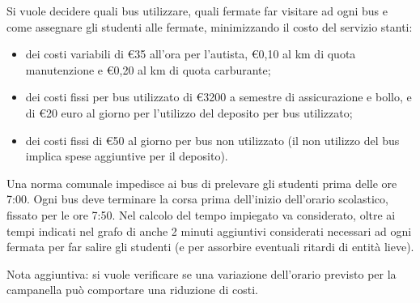  Si vuole decidere quali bus utilizzare, quali fermate far visitare ad ogni bus e come assegnare gli studenti alle fermate, minimizzando il costo del servizio stanti:

\begin{itemize}
 \item dei costi variabili di €35 all'ora per l'autista, €0,10 al km di quota manutenzione e €0,20 al km di quota carburante;
 \item dei costi fissi per bus utilizzato di €3200 a semestre di assicurazione e bollo, e di €20 euro al giorno per l'utilizzo del deposito per bus utilizzato;
 \item dei costi fissi di €50 al giorno per bus non utilizzato (il non utilizzo del bus implica spese aggiuntive per il deposito).
\end{itemize}
 Una norma comunale impedisce ai bus di prelevare gli studenti prima delle ore 7:00. Ogni bus deve terminare la corsa prima dell'inizio dell'orario scolastico, fissato per le ore 7:50. Nel calcolo del tempo impiegato va considerato, oltre ai tempi indicati nel grafo di %
anche 2 minuti aggiuntivi considerati necessari ad ogni fermata per far salire gli studenti (e per assorbire eventuali ritardi di entità lieve).


 Nota aggiuntiva: si vuole verificare se una variazione dell'orario previsto per la campanella può comportare una riduzione di costi.